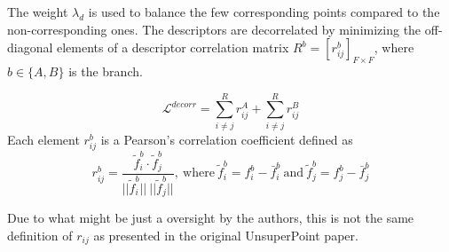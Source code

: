 The weight $\lambda_d$ is used to balance the few corresponding points compared to the non-corresponding ones. The descriptors are decorrelated by minimizing the off-diagonal elements of a descriptor correlation matrix $R^b=[r^b_{ij}]_{F\times F}$, where $b\in\{A,B\}$ is the branch.

\[
\mathcal{L}^{decorr}=\sum^R_{i\neq j}r_{ij}^A+\sum^R_{i\neq j}r_{ij}^B
\]
Each element $r^b_{ij}$ is a Pearson's correlation coefficient\cite{pearsons} defined as
\[
r^b_{ij}=
\frac{ \tilde{f}_i^b \cdot \tilde{f}_j^b }{
||\tilde{f}_i^b||\ ||\tilde{f}_j^b||
}
,\ \text{where}\ 
\tilde{f}_i^b=f_i^b-\bar{f}^b_i
\ \text{and}\ 
\tilde{f}_j^b=f_j^b-\bar{f}^b_j
\]

Due to what might be just a oversight by the authors, this is not the same definition of $r_{ij}$ as presented in the original UnsuperPoint paper.